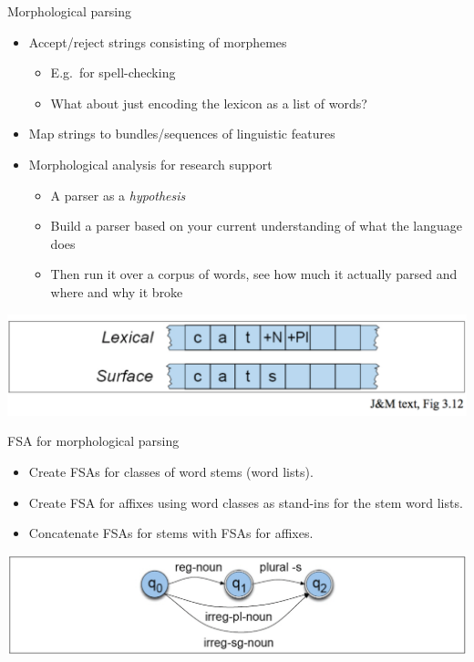 \documentclass{beamer}
\begin{document}
\begin{frame}{Morphological parsing}
  \begin{itemize}
  \item Accept/reject strings consisting of morphemes
    \begin{itemize}
    \item E.g.\ for spell-checking
    \item What about just encoding the lexicon as a list of words?
    \end{itemize}
  \item Map strings to bundles/sequences of linguistic features
  \item Morphological analysis for research support
    \begin{itemize}
    \item A parser as a {\it hypothesis}
    \item Build a parser based on your current understanding of what the language does
    \item Then run it over a corpus of words, see how much it actually parsed and where and why it broke
    \end{itemize}
  \end{itemize}
  \includegraphics[width=\textwidth]{figures/cats}
\end{frame}


\begin{frame}{FSA for morphological parsing}
  \begin{itemize}
  \item Create FSAs for classes of word stems (word lists).
  \item Create FSA for affixes using word classes as stand-ins for the stem word lists.
  \item Concatenate FSAs for stems with FSAs for affixes.
  \end{itemize}
  \includegraphics[width=\textwidth]{figures/3-3}
\end{frame}
\end{document}
